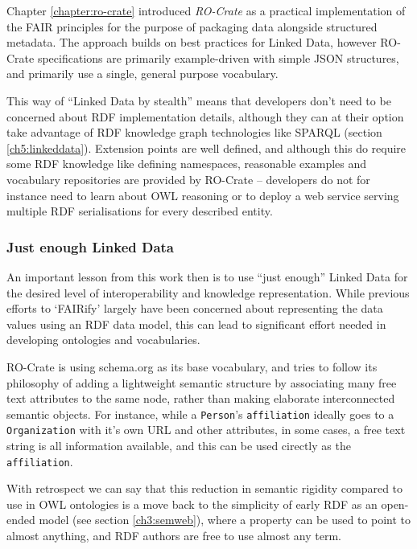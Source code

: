 Chapter \vref{chapter:ro-crate} introduced \emph{RO-Crate} as a practical implementation of the FAIR principles for the purpose of packaging data alongside structured metadata. The approach builds on best practices for Linked Data, however RO-Crate specifications are primarily example-driven with simple JSON structures, and primarily use a single, general purpose vocabulary. 

This way of ``Linked Data by stealth'' means that developers don't need to be concerned about RDF implementation details, although they can at their option take advantage of RDF knowledge graph technologies like SPARQL (section \vref{ch5:linkeddata}). Extension points are well defined, and although this do require some RDF knowledge like defining namespaces, reasonable examples and vocabulary repositories are provided by RO-Crate --  developers do not for instance need to learn about OWL reasoning or to deploy a web service serving multiple RDF serialisations for every described entity.


\subsubsection{Just enough Linked Data}

An important lesson from this work then is to use ``just enough'' Linked Data for the desired level of interoperability and knowledge representation. While previous efforts to `FAIRify' largely have been concerned about representing the data values using an RDF data model, this can lead to significant effort needed in developing ontologies and vocabularies. 

RO-Crate is using schema.org \cite{schema.org} as its base vocabulary, and tries to follow its philosophy of adding a lightweight semantic structure by associating many free text attributes to the same node, rather than making elaborate interconnected semantic objects. For instance, while a \texttt{Person}'s \texttt{affiliation} ideally goes to a \texttt{Organization} with it's own URL and other attributes, in some cases, a free text string is all information available, and this can be used cirectly as the \texttt{affiliation}. 

With retrospect we can say that this reduction in semantic rigidity compared to use in OWL ontologies is a move back to the simplicity of early RDF as an open-ended model (see section \vref{ch3:semweb}), where a property can be used to point to almost anything, and RDF authors are free to use almost any term.

